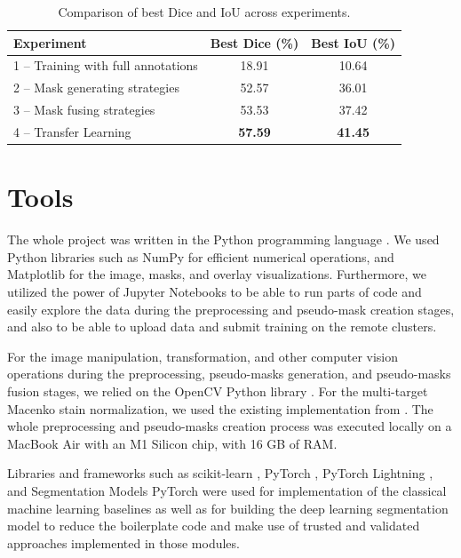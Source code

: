 \begin{table}[H]
  \centering
  \begin{tabular}{ l | c | c } 
    \hline
    \textbf{Experiment}                                  & \textbf{Best Dice (\%)} & \textbf{Best IoU (\%)} \\
    \hline
    1 – Training with full annotations                   & 18.91                   & 10.64                  \\
    2 – Mask generating strategies                       & 52.57                   & 36.01                  \\
    3 – Mask fusing strategies                           & 53.53                   & 37.42                  \\
    4 – Transfer Learning                                & \textbf{57.59}          & \textbf{41.45}          \\
    \hline
  \end{tabular}
  \caption{Comparison of best Dice and IoU across experiments.}
  \label{tab:summary-experiments}
\end{table}


\section{Tools}
The whole project was written in the Python programming language \cite{python}. We used Python libraries such as NumPy \cite{numpy} for efficient numerical operations, and Matplotlib \cite{matplotlib} for the image, masks, and overlay visualizations. Furthermore, we utilized the power of Jupyter Notebooks \cite{jupyter} to be able to run parts of code and easily explore the data during the preprocessing and pseudo-mask creation stages, and also to be able to upload data and submit training on the remote clusters.

For the image manipulation, transformation, and other computer vision operations during the preprocessing, pseudo-masks generation, and pseudo-masks fusion stages, we relied on the OpenCV Python library \cite{open-cv}. For the multi-target Macenko stain normalization, we used the existing implementation from \cite{torchstain}. The whole preprocessing and pseudo-masks creation process was executed locally on a MacBook Air with an M1 Silicon chip, with 16 GB of RAM.

Libraries and frameworks such as scikit-learn \cite{scikit-learn}, PyTorch \cite{pytorch}, PyTorch Lightning \cite{pytorch-ligthning}, and Segmentation Models PyTorch \cite{smp} were used for implementation of the classical machine learning baselines as well as for building the deep learning segmentation model to reduce the boilerplate code and make use of trusted and validated approaches implemented in those modules.

